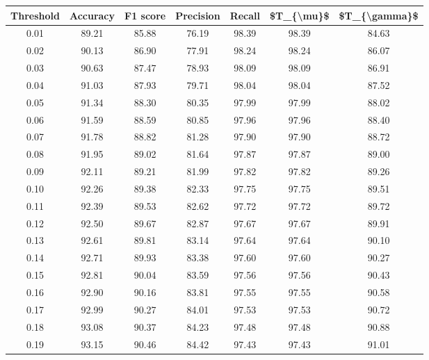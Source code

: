 \begin{tabular}{|c|c|c|c|c|c|c|}
\hline
 Threshold &  Accuracy &  F1 score &  Precision &  Recall &  \$T\_\{\textbackslash mu\}\$ &  \$T\_\{\textbackslash gamma\}\$ \\
\hline
      0.01 &     89.21 &     85.88 &      76.19 &   98.39 &      98.39 &         84.63 \\
      0.02 &     90.13 &     86.90 &      77.91 &   98.24 &      98.24 &         86.07 \\
      0.03 &     90.63 &     87.47 &      78.93 &   98.09 &      98.09 &         86.91 \\
      0.04 &     91.03 &     87.93 &      79.71 &   98.04 &      98.04 &         87.52 \\
      0.05 &     91.34 &     88.30 &      80.35 &   97.99 &      97.99 &         88.02 \\
      0.06 &     91.59 &     88.59 &      80.85 &   97.96 &      97.96 &         88.40 \\
      0.07 &     91.78 &     88.82 &      81.28 &   97.90 &      97.90 &         88.72 \\
      0.08 &     91.95 &     89.02 &      81.64 &   97.87 &      97.87 &         89.00 \\
      0.09 &     92.11 &     89.21 &      81.99 &   97.82 &      97.82 &         89.26 \\
      0.10 &     92.26 &     89.38 &      82.33 &   97.75 &      97.75 &         89.51 \\
      0.11 &     92.39 &     89.53 &      82.62 &   97.72 &      97.72 &         89.72 \\
      0.12 &     92.50 &     89.67 &      82.87 &   97.67 &      97.67 &         89.91 \\
      0.13 &     92.61 &     89.81 &      83.14 &   97.64 &      97.64 &         90.10 \\
      0.14 &     92.71 &     89.93 &      83.38 &   97.60 &      97.60 &         90.27 \\
      0.15 &     92.81 &     90.04 &      83.59 &   97.56 &      97.56 &         90.43 \\
      0.16 &     92.90 &     90.16 &      83.81 &   97.55 &      97.55 &         90.58 \\
      0.17 &     92.99 &     90.27 &      84.01 &   97.53 &      97.53 &         90.72 \\
      0.18 &     93.08 &     90.37 &      84.23 &   97.48 &      97.48 &         90.88 \\
      0.19 &     93.15 &     90.46 &      84.42 &   97.43 &      97.43 &         91.01 \\

\end{tabular}

